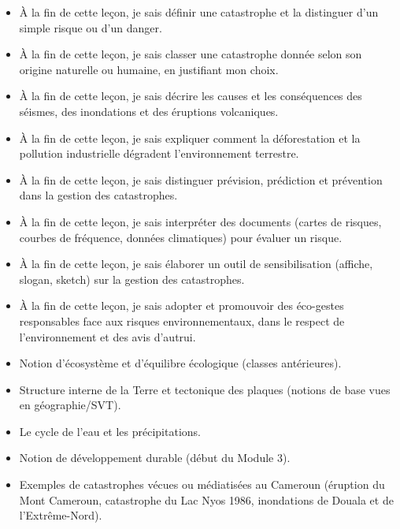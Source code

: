 \documentclass[11pt]{article}
\begin{document}
\begin{objectifs}
\begin{itemize}
\item À la fin de cette leçon, je sais définir une catastrophe et la distinguer d'un simple risque ou d'un danger.
\item À la fin de cette leçon, je sais classer une catastrophe donnée selon son origine naturelle ou humaine, en justifiant mon choix.
\item À la fin de cette leçon, je sais décrire les causes et les conséquences des séismes, des inondations et des éruptions volcaniques.
\item À la fin de cette leçon, je sais expliquer comment la déforestation et la pollution industrielle dégradent l'environnement terrestre.
\item À la fin de cette leçon, je sais distinguer prévision, prédiction et prévention dans la gestion des catastrophes.
\item À la fin de cette leçon, je sais interpréter des documents (cartes de risques, courbes de fréquence, données climatiques) pour évaluer un risque.
\item À la fin de cette leçon, je sais élaborer un outil de sensibilisation (affiche, slogan, sketch) sur la gestion des catastrophes.
\item À la fin de cette leçon, je sais adopter et promouvoir des éco-gestes responsables face aux risques environnementaux, dans le respect de l'environnement et des avis d'autrui.
\end{itemize}
\end{objectifs}

\begin{prerequis}
\begin{itemize}
\item Notion d'écosystème et d'équilibre écologique (classes antérieures).
\item Structure interne de la Terre et tectonique des plaques (notions de base vues en géographie/SVT).
\item Le cycle de l'eau et les précipitations.
\item Notion de développement durable (début du Module 3).
\item Exemples de catastrophes vécues ou médiatisées au Cameroun (éruption du Mont Cameroun, catastrophe du Lac Nyos 1986, inondations de Douala et de l'Extrême-Nord).
\end{itemize}
\end{prerequis}
\end{document}
